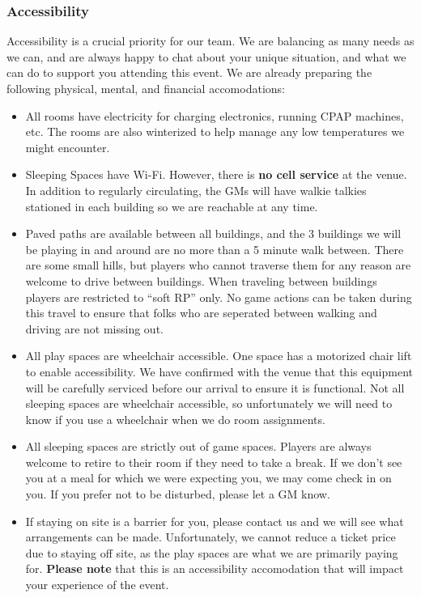 \documentclass[sheet]{GL2020}
\begin{document}
\subsubsection{Accessibility}
Accessibility is a crucial priority for our team. We are balancing as many needs as we can, and are always happy to chat about your unique situation, and what we can do to support you attending this event. We are already preparing the following physical, mental, and financial accomodations:

\begin{itemize}
  \item All rooms have electricity for charging electronics, running CPAP machines, etc. The rooms are also winterized to help manage any low temperatures we might encounter.
  \item Sleeping Spaces have Wi-Fi. However, there is \textbf{no cell service} at the venue. In addition to regularly circulating, the GMs will have walkie talkies stationed in each building so we are reachable at any time.
  \item Paved paths are available between all buildings, and the 3 buildings we will be playing in and around are no more than a 5 minute walk between. There are some small hills, but players who cannot traverse them for any reason are welcome to drive between buildings. When traveling between buildings players are restricted to ``soft RP'' only. No game actions can be taken during this travel to ensure that folks who are seperated between walking and driving are not missing out.
  \item All play spaces are wheelchair accessible. One space has a motorized chair lift to enable accessibility. We have confirmed with the venue that this equipment will be carefully serviced before our arrival to ensure it is functional. Not all sleeping spaces are wheelchair accessible, so unfortunately we will need to know if you use a wheelchair when we do room assignments.
  \item All sleeping spaces are strictly out of game spaces. Players are always welcome to retire to their room if they need to take a break. If we don't see you at a meal for which we were expecting you, we may come check in on you. If you prefer not to be disturbed, please let a GM know.
  \item If staying on site is a barrier for you, please contact us and we will see what arrangements can be made. Unfortunately, we cannot reduce a ticket price due to staying off site, as the play spaces are what we are primarily paying for. \textbf{Please note} that this is an accessibility accomodation that will impact your experience of the event.

\end{itemize}
\end{document}
